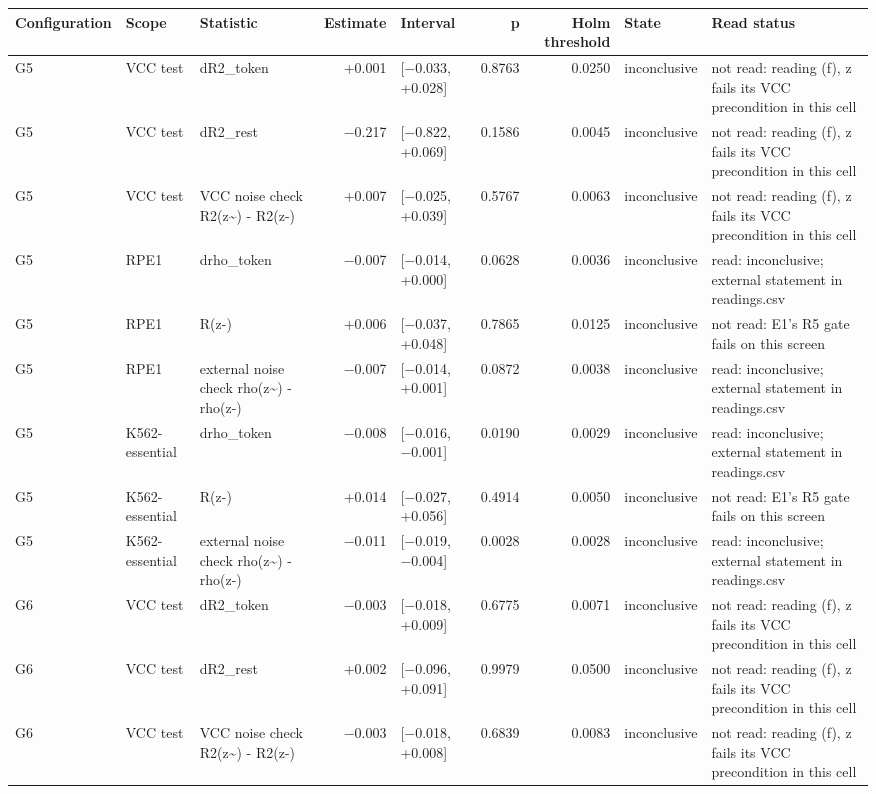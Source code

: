 \begin{tabular}{lllrlrrll}
\toprule
Configuration & Scope & Statistic & Estimate & Interval & p & Holm threshold & State & Read status \\
\midrule
G5 & VCC test & dR2\_token & +0.001 & [−0.033, +0.028] & 0.8763 & 0.0250 & inconclusive & not read: reading (f), z fails its VCC precondition in this cell \\
G5 & VCC test & dR2\_rest & −0.217 & [−0.822, +0.069] & 0.1586 & 0.0045 & inconclusive & not read: reading (f), z fails its VCC precondition in this cell \\
G5 & VCC test & VCC noise check R2(z\textasciitilde{}) - R2(z-) & +0.007 & [−0.025, +0.039] & 0.5767 & 0.0063 & inconclusive & not read: reading (f), z fails its VCC precondition in this cell \\
G5 & RPE1 & drho\_token & −0.007 & [−0.014, +0.000] & 0.0628 & 0.0036 & inconclusive & read: inconclusive; external statement in readings.csv \\
G5 & RPE1 & R(z-) & +0.006 & [−0.037, +0.048] & 0.7865 & 0.0125 & inconclusive & not read: E1's R5 gate fails on this screen \\
G5 & RPE1 & external noise check rho(z\textasciitilde{}) - rho(z-) & −0.007 & [−0.014, +0.001] & 0.0872 & 0.0038 & inconclusive & read: inconclusive; external statement in readings.csv \\
G5 & K562-essential & drho\_token & −0.008 & [−0.016, −0.001] & 0.0190 & 0.0029 & inconclusive & read: inconclusive; external statement in readings.csv \\
G5 & K562-essential & R(z-) & +0.014 & [−0.027, +0.056] & 0.4914 & 0.0050 & inconclusive & not read: E1's R5 gate fails on this screen \\
G5 & K562-essential & external noise check rho(z\textasciitilde{}) - rho(z-) & −0.011 & [−0.019, −0.004] & 0.0028 & 0.0028 & inconclusive & read: inconclusive; external statement in readings.csv \\
G6 & VCC test & dR2\_token & −0.003 & [−0.018, +0.009] & 0.6775 & 0.0071 & inconclusive & not read: reading (f), z fails its VCC precondition in this cell \\
G6 & VCC test & dR2\_rest & +0.002 & [−0.096, +0.091] & 0.9979 & 0.0500 & inconclusive & not read: reading (f), z fails its VCC precondition in this cell \\
G6 & VCC test & VCC noise check R2(z\textasciitilde{}) - R2(z-) & −0.003 & [−0.018, +0.008] & 0.6839 & 0.0083 & inconclusive & not read: reading (f), z fails its VCC precondition in this cell \\

\end{tabular}
